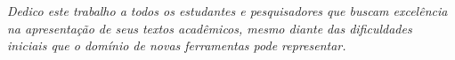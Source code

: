 \begin{dedicatoria}
    \vspace*{\fill}

    \centering
    \textit{Dedico este trabalho a todos os estudantes e pesquisadores que buscam excelência na apresentação de seus textos acadêmicos, mesmo diante das dificuldades iniciais que o domínio de novas ferramentas pode representar.}%

    \vspace*{\fill}
\end{dedicatoria}

